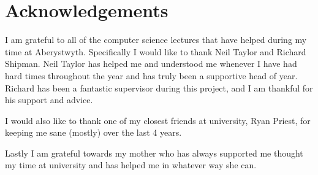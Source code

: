 \thispagestyle{empty}


\section*{\centering Acknowledgements}

I am grateful to all of the computer science lectures that have helped during my time at Aberystwyth. Specifically I would like to thank Neil Taylor and Richard Shipman. Neil Taylor has helped me and understood me whenever I have had hard times throughout the year and has truly been a supportive head of year. Richard has been a fantastic supervisor during this project, and I am thankful for his support and advice.

I would also like to thank one of my closest friends at university, Ryan Priest, for keeping me sane (mostly) over the last 4 years.

Lastly I am grateful towards my mother who has always supported me thought my time at university and has helped me in whatever way she can.


